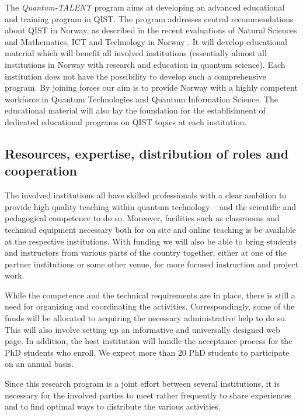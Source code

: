 \documentclass{scrreprt}
\begin{document}
The \textit{Quantum-TALENT} program aims at developing an advanced educational and training program in QIST. The program addresses central recommendations about QIST in Norway, as described in the recent evaluations of Natural Sciences and Mathematics, ICT and Technology in Norway \cite{evalnat,evalmat}. 
It will develop educational material which will benefit all involved institutions (essentially almost all  institutions in Norway with research and education in quantum science). Each institution does not have the possibility to develop such a comprehensive program. By joining forces our aim is to provide Norway with a highly competent workforce in Quantum Technologies and Quantum Information Science.  The educational material will also lay the foundation for the establishment of dedicated educational programs on QIST topics at each institution.


\subsection{Resources, expertise, distribution of roles and cooperation}

The involved institutions all have skilled professionals with a clear ambition to provide high quality teaching within quantum technology -- and the scientific and pedagogical competence to do so. Moreover, facilities such as classrooms and technical equipment necessary both for on site and online teaching is be available at the respective institutions. With funding we will also be able to bring students and instructors from various parts of the country together, either at one of the partner institutions or some other venue, for more focused instruction and project work.

While the competence and the technical requirements are in place, there is still a need for organizing and coordinating the activities. Correspondingly, some of the funds will be allocated to acquiring the necessary administrative help to do so. This will also involve setting up an informative and universally designed web page. In addition, the host institution will handle the acceptance process for the PhD students who enroll. We expect more than 20 PhD students to participate on an annual basis.

Since this research program is a joint effort between several institutions, it is necessary for the involved parties to meet rather frequently to share experiences and to find optimal ways to distribute the various activities.
\end{document}

